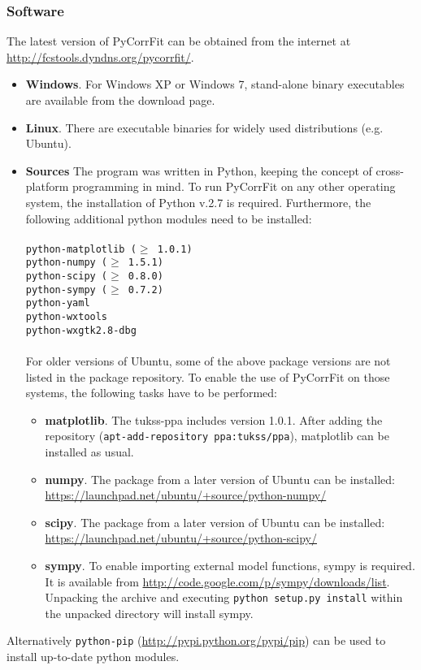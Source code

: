 \subsubsection{Software}
\label{cha:soft}
The latest version of PyCorrFit can be obtained from the internet at \url{http://fcstools.dyndns.org/pycorrfit/}.
\begin{itemize}
\item \textbf{Windows}.
For Windows XP or Windows 7, stand-alone binary executables are available from the download page. 
\item \textbf{Linux}.
There are executable binaries for widely used distributions (e.g. Ubuntu).
\item \textbf{Sources}
The program was written in Python, keeping the concept of cross-platform programming in mind. To run PyCorrFit on any other operating system, the installation of Python v.2.7 is required. Furthermore, the following additional python modules need to be installed:\\
\texttt{\\
python-matplotlib ($\geq$ 1.0.1) \\
python-numpy ($\geq$ 1.5.1) \\
python-scipy ($\geq$ 0.8.0) \\
python-sympy ($\geq$ 0.7.2) \\
python-yaml \\
python-wxtools \\
python-wxgtk2.8-dbg \\
}
\\
For older versions of Ubuntu, some of the above package versions are not listed in the package repository. To enable the use of PyCorrFit on those systems, the following tasks have to be performed:
\begin{itemize}
\item[ ] \textbf{matplotlib}. The tukss-ppa includes version 1.0.1. After adding the repository (\texttt{apt-add-repository ppa:tukss/ppa}), matplotlib can be installed as usual.
\item[ ] \textbf{numpy}. The package from a later version of Ubuntu can be installed: \url{https://launchpad.net/ubuntu/+source/python-numpy/}
\item[ ] \textbf{scipy}. The package from a later version of Ubuntu can be installed: \url{https://launchpad.net/ubuntu/+source/python-scipy/}
\item[ ] \textbf{sympy}. To enable importing external model functions, sympy is required. It is available from \url{http://code.google.com/p/sympy/downloads/list}. Unpacking the archive and executing \texttt{python setup.py install} within the unpacked directory will install sympy.
\end{itemize}
\end{itemize}
Alternatively \texttt{python-pip} (\url{http://pypi.python.org/pypi/pip}) can be used to install up-to-date python modules.

